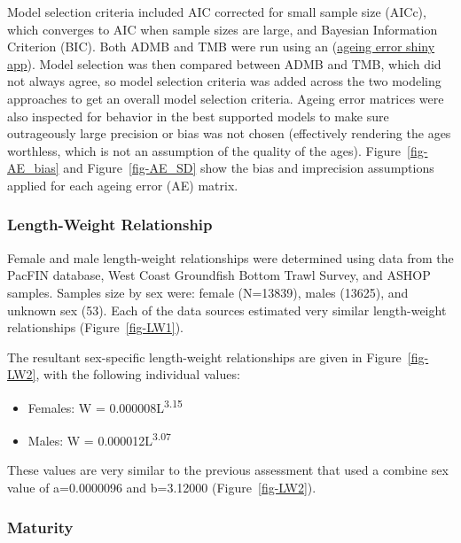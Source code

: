 \documentclass[
]{scrartcl}
\providecommand{\tightlist}{%
  \setlength{\itemsep}{0pt}\setlength{\parskip}{0pt}}\usepackage{longtable,booktabs,array}
\begin{document}
Model selection criteria included AIC corrected for small sample size
(AICc), which converges to AIC when sample sizes are large, and Bayesian
Information Criterion (BIC). Both ADMB and TMB were run using an
(\href{https://github.com/shcaba/Ageing_Error_app}{ageing error shiny app}).
Model selection was then compared between ADMB and TMB, which did not
always agree, so model selection criteria was added across the two
modeling approaches to get an overall model selection criteria. Ageing
error matrices were also inspected for behavior in the best supported
models to make sure outrageously large precision or bias was not chosen
(effectively rendering the ages worthless, which is not an assumption of
the quality of the ages). Figure~\ref{fig-AE_bias} and
Figure~\ref{fig-AE_SD} show the bias and imprecision assumptions applied
for each ageing error (AE) matrix.

\subsubsection{Length-Weight
Relationship}\label{length-weight-relationship}

Female and male length-weight relationships were determined using data
from the PacFIN database, West Coast Groundfish Bottom Trawl Survey, and
ASHOP samples. Samples size by sex were: female (N=13839), males
(13625), and unknown sex (53). Each of the data sources estimated very
similar length-weight relationships (Figure~\ref{fig-LW1}).

The resultant sex-specific length-weight relationships are given in
Figure~\ref{fig-LW2}, with the following individual values:

\begin{itemize}
\tightlist
\item
  Females: W = 0.000008L\textsuperscript{3.15}
\item
  Males: W = 0.000012L\textsuperscript{3.07}
\end{itemize}

These values are very similar to the previous assessment that used a
combine sex value of a=0.0000096 and b=3.12000 (Figure~\ref{fig-LW2}).

\subsubsection{Maturity}\label{maturity}
\end{document}
